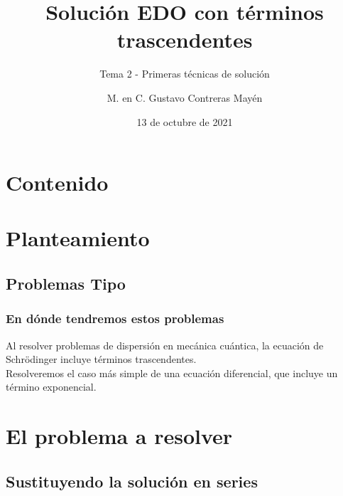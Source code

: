 \documentclass[12pt]{beamer}
\date{13 de octubre de 2021}
\title{\large{Solución EDO con términos trascendentes}}
\subtitle{Tema 2 - Primeras técnicas de solución}
\author{M. en C. Gustavo Contreras Mayén}
\begin{document}
\maketitle
\fontsize{14}{14}\selectfont
{}

\section*{Contenido}

\section{Planteamiento}
\subsection{Problemas Tipo}

\begin{frame}
\frametitle{En dónde tendremos estos problemas}
Al resolver problemas de dispersión en mecánica cuántica, la ecuación de Schrödinger incluye términos trascendentes.
\\
\bigskip
\pause
Resolveremos el caso más simple de una ecuación diferencial, que incluye un término exponencial.
\end{frame}

\section{El problema a resolver}
\subsection{Sustituyendo la solución en series}
\end{document}
